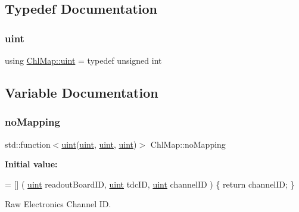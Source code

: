 \subsection{Typedef Documentation}
\mbox{\label{namespace_chl_map_a7ef435046de5fb240ed873ae9fe91254}} 
\subsubsection{\texorpdfstring{uint}{uint}}
{\footnotesize\ttfamily using \hyperlink{namespace_chl_map_a7ef435046de5fb240ed873ae9fe91254}{Chl\+Map\+::uint} = typedef unsigned int}



\subsection{Variable Documentation}
\mbox{\label{namespace_chl_map_a737b285621b10b9c3980dc18b8ba1b18}} 
\subsubsection{\texorpdfstring{no\+Mapping}{noMapping}}
{\footnotesize\ttfamily std\+::function$<$\hyperlink{namespace_chl_map_a7ef435046de5fb240ed873ae9fe91254}{uint}(\hyperlink{namespace_chl_map_a7ef435046de5fb240ed873ae9fe91254}{uint}, \hyperlink{namespace_chl_map_a7ef435046de5fb240ed873ae9fe91254}{uint}, \hyperlink{namespace_chl_map_a7ef435046de5fb240ed873ae9fe91254}{uint})$>$ Chl\+Map\+::no\+Mapping}

{\bfseries Initial value\+:}
\begin{DoxyCode}
= [] (
    \hyperlink{_packet_8cpp_a69aa29b598b851b0640aa225a9e5d61d}{uint} readoutBoardID,
    \hyperlink{_packet_8cpp_a69aa29b598b851b0640aa225a9e5d61d}{uint} tdcID,
    \hyperlink{_packet_8cpp_a69aa29b598b851b0640aa225a9e5d61d}{uint} channelID
) \{
    \textcolor{keywordflow}{return} channelID;
\}
\end{DoxyCode}


Raw Electronics Channel ID. 

\mbox{\label{namespace_chl_map_a0c1a33254dc47f2250f48c234f6f91f7}} 
